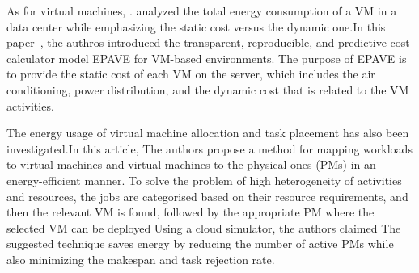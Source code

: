 As for virtual machines, \citeauthor{kurpicz2016much}. analyzed the total energy consumption of a VM in a data center while emphasizing the static cost versus the dynamic one.In this paper~\cite{kurpicz2016much}, the authros introduced the transparent, reproducible, and predictive cost calculator model EPAVE for VM-based environments. The purpose of EPAVE is to provide the static cost of each VM on the server, which includes the air conditioning, power distribution, and the dynamic cost that is related to the VM activities.

The energy usage of virtual machine allocation and task placement has also been investigated\cite{mishra_energy_2018}.In this article, The authors propose a method for mapping workloads to virtual machines and virtual machines to the physical ones (PMs) in an energy-efficient manner. To solve the problem of high heterogeneity of activities and resources, the jobs are categorised based on their resource requirements, and then the relevant VM is found, followed by the appropriate PM where the selected VM can be deployed Using a cloud simulator, the authors claimed The suggested technique saves energy by reducing the number of active PMs while also minimizing the makespan and task rejection rate.




















